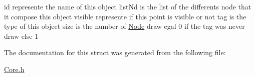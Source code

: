 id represente the name of this object list\-Nd is the list of the differents node that it compose this object visible represente if this point is visible or not tag is the type of this object size is the number of \hyperlink{structNode}{Node} draw egal 0 if the tag was never draw else 1 

The documentation for this struct was generated from the following file\-:\begin{DoxyCompactItemize}
\item 
\hyperlink{Core_8h}{Core.\-h}\end{DoxyCompactItemize}
